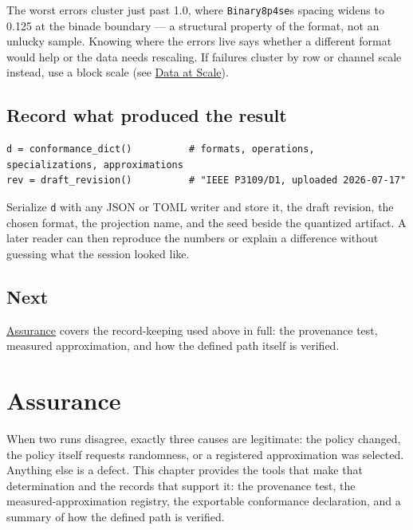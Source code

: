 The worst errors cluster just past 1.0, where \texttt{Binary8p4se}{\textquotesingle}s spacing widens to 0.125 at the binade boundary — a structural property of the format, not an unlucky sample. Knowing where the errors live says whether a different format would help or the data needs rescaling. If failures cluster by row or channel scale instead, use a block scale (see \href{data.md}{Data at Scale}).



\section{Record what produced the result}



\label{12845234384692473716}{}



\begin{verbatim}
d = conformance_dict()          # formats, operations, specializations, approximations
rev = draft_revision()          # "IEEE P3109/D1, uploaded 2026-07-17"
\end{verbatim}



Serialize \texttt{d} with any JSON or TOML writer and store it, the draft revision, the chosen format, the projection name, and the seed beside the quantized artifact. A later reader can then reproduce the numbers or explain a difference without guessing what the session looked like.



\section{Next}



\label{9862256287407127426-dup3}{}


\href{assurance.md}{Assurance} covers the record-keeping used above in full: the provenance test, measured approximation, and how the defined path itself is verified.





\chapter{Assurance}



\label{14478627307656753823}{}


When two runs disagree, exactly three causes are legitimate: the policy changed, the policy itself requests randomness, or a registered approximation was selected. Anything else is a defect. This chapter provides the tools that make that determination and the records that support it: the provenance test, the measured-approximation registry, the exportable conformance declaration, and a summary of how the defined path is verified.



